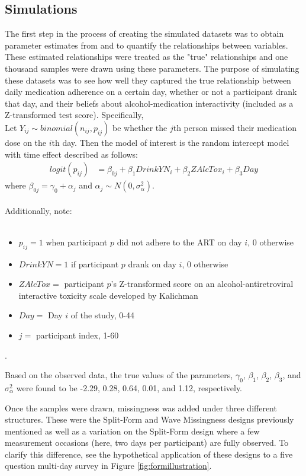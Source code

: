 \documentclass{svjour3}\usepackage[]{graphicx}\usepackage[]{color}
\begin{document}
\subsection{Simulations}
\label{sec:2.2}
The first step in the process of creating the simulated datasets was to obtain parameter estimates from \citet{pellowski2016alcohol} and to quantify the relationships between variables. These estimated relationships were treated as the "true" relationships and one thousand samples were drawn using these parameters. The purpose of simulating these datasets was to see how well they captured the true relationship between daily medication adherence on a certain day, whether or not a participant drank that day, and their beliefs about alcohol-medication interactivity (included as a Z-transformed test score). Specifically, \\

Let $Y_{ij} \sim binomial(n_{ij},p_{ij})$ be whether the $j$th person missed their medication dose on the $i$th day. Then the model of interest is the random intercept model with time effect described as follows:
\begin{align*}
logit(p_{ij}) &= \beta_{0j} + \beta_1DrinkYN_i + \beta_2ZAlcTox_i +\beta_3Day
\end{align*}
where $\beta_{0j} = \gamma_0 + \alpha_j$ and $\alpha_j \sim N(0,\sigma_\alpha^2)$. \\ \\ 
Additionally, note: \\ \\
\begin{itemize}
\item $p_{ij} = 1$ when participant $p$ did not adhere to the ART on day $i$, 0 otherwise \\
\item $DrinkYN = 1$ if participant $p$  drank on day $i$, 0 otherwise\\
\item $ZAlcTox =$ participant $p$'s Z-transformed score on an alcohol-antiretroviral interactive toxicity scale developed by Kalichman \cite{kalichman2009prevalence} \\
\item $Day =$ Day $i$ of the study, 0-44 \\
\item $j =$ participant index, 1-60 \\
\end{itemize}.

Based on the observed data, the true values of the parameters, $\gamma_0$, $\beta_1$, $\beta_2$, $\beta_3$, and $\sigma_\alpha^2$ were found to be -2.29, 0.28, 0.64, 0.01, and 1.12, respectively. \par
Once the samples were drawn, missingness was added under three different structures. These were the Split-Form and Wave Missingness designs previously mentioned as well as a variation on the Split-Form design where a few measurement occasions (here, two days per participant) are fully observed. To clarify this difference, see the hypothetical application of these designs to a five question multi-day survey in Figure \ref{fig:formillustration}. \par
\end{document}
